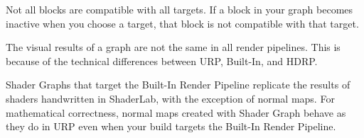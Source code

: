Not all blocks are compatible with all targets. If a block in your graph becomes inactive when you choose a target, that block is not compatible with that target.

The visual results of a graph are not the same in all render pipelines. This is because of the technical differences between URP, Built-\/\+In, and HDRP.

Shader Graphs that target the Built-\/\+In Render Pipeline replicate the results of shaders handwritten in Shader\+Lab, with the exception of normal maps. For mathematical correctness, normal maps created with Shader Graph behave as they do in URP even when your build targets the Built-\/\+In Render Pipeline. 